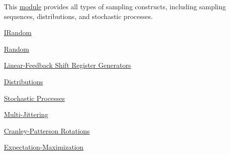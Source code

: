 \begin{DoxyParagraph}{}
This \hyperlink{group__sampling}{module} provides all types of sampling constructs, including sampling sequences, distributions, and stochastic processes.
\end{DoxyParagraph}

\begin{DoxyItemize}
\item \hyperlink{structcugar_1_1_i_random}{I\+Random}
\item \hyperlink{structcugar_1_1_random}{Random}
\item \hyperlink{group___l_f_s_r_module}{Linear-\/\+Feedback Shift Register Generators}
\item \hyperlink{group__distributions}{Distributions}
\item \hyperlink{group__processes}{Stochastic Processes}
\item \hyperlink{group__multijitter}{Multi-\/\+Jittering}
\item \hyperlink{group__cp__rotations}{Cranley-\/\+Patterson Rotations}
\item \hyperlink{group___expectation_maximization_module}{Expectation-\/\+Maximization} 
\end{DoxyItemize}